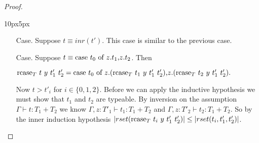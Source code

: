 \begin{proof}
\begin{changemargin}{10px}{5px}
\begin{itemize}
\begin{itemize}
  \item[Case.] Suppose $t \equiv inr(t')$.  This case is similar to the previous case.

  \item[Case.] Suppose $t \equiv \mbox{case}\ t_0\ \text{of}\ z\text{.}t_1\text{,}z\text{.}t_2$.  Then
    \begin{center}
      \begin{math}
        \mbox{rcase}_{T}\ t\ y\ t'_1\ t'_2 = 
        \mbox{case}\ t_0\ \text{of}\ z\text{.}(\mbox{rcase}_{T}\ t_1\ y\ t'_1\ t'_2)\text{,}z\text{.}(\mbox{rcase}_{T}\ t_2\ y\ t'_1\ t'_2).
      \end{math}
    \end{center}
    Now $t > t'_i$ for $i \in \{0,1,2\}$. Before we can apply the inductive hypothesis we must show that $t_1$ and $t_2$ 
    are typeable.  By inversion on the assumption $\Gamma \vdash t:T_1+T_2$ we know 
    $\Gamma,z:T'_1 \vdash t_1:T_1+T_2$ and $\Gamma,z:T'_2 \vdash t_2:T_1+T_2$.  So by the inner induction 
    hypothesis $|rset(\mbox{rcase}_{T}\ t_i\ y\ t'_1\ t'_2)| \leq |rset(t_i,t'_1,t'_2)|$.
            

\end{itemize}
\end{itemize}
\end{changemargin}
\end{proof}
